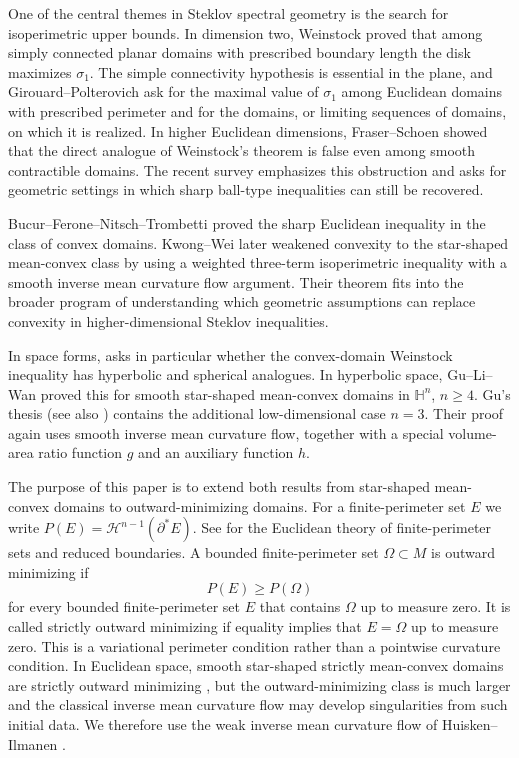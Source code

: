 \documentclass[11pt,reqno]{amsart}
\numberwithin{equation}{section}
\theoremstyle{definition}
\newcommand{\calH}{\mathcal H}
\newcommand{\HH}{\mathbb H}
\begin{document}
One of the central themes in Steklov spectral geometry is the search for isoperimetric upper bounds.  In dimension two, Weinstock \cite{W1954} proved that among simply connected planar domains with prescribed boundary length the disk maximizes $\sigma_1$.  The simple connectivity hypothesis is essential in the plane, and Girouard--Polterovich  \cite[Open Problem~2]{GP2017} ask for the maximal value of $\sigma_1$ among Euclidean domains with prescribed perimeter and for the domains, or limiting sequences of domains, on which it is realized.  In higher Euclidean dimensions, Fraser--Schoen  \cite{FS2019} showed that the direct analogue of Weinstock's theorem is false even among smooth contractible domains.  The recent survey \cite[Section~4]{CGGS24} emphasizes this obstruction and asks for geometric settings in which sharp ball-type inequalities can still be recovered.

Bucur--Ferone--Nitsch--Trombetti \cite{BFNT2021} proved the sharp Euclidean inequality in the class of convex domains.  Kwong--Wei \cite{KwongWei2023} later weakened convexity to the star-shaped mean-convex class by using a weighted three-term isoperimetric inequality \cite{GR2020} with a smooth inverse mean curvature flow argument.  Their theorem fits into the broader program of understanding which geometric assumptions can replace convexity in higher-dimensional Steklov inequalities.  

In space forms, \cite[Open Question~4.27]{CGGS24} asks in particular whether the convex-domain Weinstock inequality has hyperbolic and spherical analogues.  In hyperbolic space, Gu--Li--Wan \cite{GuLiWan2025} proved this for smooth star-shaped mean-convex domains in $\HH^n$, $n\geq4$.  Gu's thesis \cite{GuThesis2026} (see also \cite{GLW26}) contains the additional low-dimensional case $n=3$.  Their proof again uses smooth inverse mean curvature flow, together with a special volume-area ratio function $g$ and an auxiliary function $h$.

The purpose of this paper is to extend both results \cite{KwongWei2023,GuLiWan2025,GuThesis2026} from star-shaped mean-convex domains to outward-minimizing domains.  For a finite-perimeter set $E$ we write $P(E)=\calH^{n-1}(\partial^*E)$.  See \cite[Chapters~12 and~15]{Maggi2012} for the Euclidean theory of finite-perimeter sets and reduced boundaries.  A bounded finite-perimeter set $\Omega\subset M$ is outward minimizing if
\begin{equation*}
    P(E)\geq P(\Omega)
\end{equation*}
for every bounded finite-perimeter set $E$ that contains $\Omega$ up to measure zero.  It is called strictly outward minimizing if equality implies that $E=\Omega$ up to measure zero.  This is a variational perimeter condition rather than a pointwise curvature condition.  In Euclidean space, smooth star-shaped strictly mean-convex domains are strictly outward minimizing \cite[Corollary~3.8]{FM22}, but the outward-minimizing class is much larger and the classical inverse mean curvature flow may develop singularities from such initial data.  We therefore use the weak inverse mean curvature flow of Huisken--Ilmanen \cite{HI2001}.  
\end{document}
